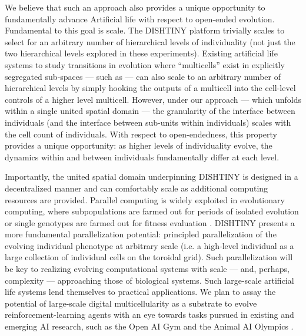 We believe that such an approach also provides a unique opportunity to fundamentally advance Artificial life with respect to open-ended evolution.
Fundamental to this goal is scale.
The DISHTINY platform trivially scales to select for an arbitrary number of hierarchical levels of individuality (not just the two hierarchical levels explored in these experiments).
Existing artificial life systems to study transitions in evolution where ``multicells'' exist in explicitly segregated sub-spaces --- such as \citep{goldsby2014evolutionary} --- can also scale to an arbitrary number of hierarchical levels by simply hooking the outputs of a multicell into the cell-level controls of a higher level multicell.
However, under our approach --- which unfolds within a single united spatial domain --- the granularity of the interface between individuals (and the interface between sub-units within individuals) scales with the cell count of individuals.
With respect to open-endedness, this property provides a unique opportunity: as higher levels of individuality evolve, the dynamics within and between individuals fundamentally differ at each level.

Importantly, the united spatial domain underpinning DISHTINY is designed in a decentralized manner and can comfortably scale as additional computing resources are provided.
Parallel computing is widely exploited in evolutionary computing, where subpopulations are farmed out for periods of isolated evolution or single genotypes are farmed out for fitness evaluation
\citep{lin1994coarse, real17a}.
DISHTINY presents a more fundamental parallelization potential: principled parallelization of the evolving individual phenotype at arbitrary scale (i.e. a high-level individual as a large collection of individual cells on the toroidal grid).
Such parallelization will be key to realizing evolving computational systems with scale --- and, perhaps, complexity --- approaching those of biological systems.
Such large-scale artificial life systems lend themselves to practical applications.
We plan to assay the potential of large-scale digital multicellularity as a substrate to evolve reinforcement-learning agents with an eye towards tasks pursued in existing and emerging AI research, such as the Open AI Gym and the Animal AI Olympics \citep{brockman2016openai}.
